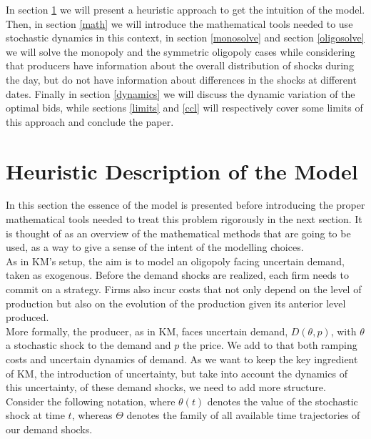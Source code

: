 In section \ref{heur} we will present a heuristic approach to get the intuition of the model. Then, in section \ref{math} we will introduce the mathematical tools needed to use stochastic dynamics in this context, in section \ref{monosolve} and section \ref{oligosolve} we will solve the monopoly and the symmetric oligopoly cases while considering that producers have information about the overall distribution of shocks during the day, but do not have information about differences in the shocks at different dates. Finally in section \ref{dynamics} we will discuss the dynamic variation of the optimal bids, while sections \ref{limits} and \ref{ccl} will respectively cover some limits of this approach and conclude the paper.  

\section{Heuristic Description of the Model}\label{heur}
In this section the essence of the model is presented before introducing the proper mathematical tools needed to treat this problem rigorously in the next section. It is thought of as an overview of the mathematical methods that are going to be used, as a way to give a sense of the intent of the modelling choices.\\

As in KM's setup, the aim is to model an oligopoly facing uncertain demand, taken as exogenous. Before the demand shocks are realized, each firm needs to commit on a strategy. Firms also incur costs that not only depend on the level of production but also on the evolution of the production given its anterior level produced. \\

More formally, the producer, as in KM, faces uncertain demand, $D(\theta,p)$, with $\theta$ a stochastic shock to the demand and $p$ the price. We add to that both ramping costs and uncertain dynamics of demand. As we want to keep the key ingredient of KM, the introduction of uncertainty, but take into account the dynamics of this uncertainty, of these demand shocks, we need to add more structure.\\

Consider the following notation, where $\theta(t)$ denotes the value of the stochastic shock at time $t$, whereas $\Theta$ denotes the family of all available time trajectories of our demand shocks. \\

